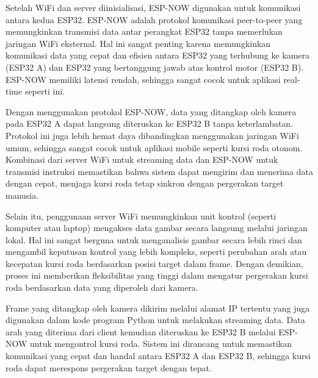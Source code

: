 Setelah WiFi dan server diinisialisasi, ESP-NOW digunakan untuk komunikasi antara kedua ESP32. ESP-NOW adalah protokol komunikasi peer-to-peer yang memungkinkan transmisi data antar perangkat ESP32 tanpa memerlukan jaringan WiFi eksternal. Hal ini sangat penting karena memungkinkan komunikasi data yang cepat dan efisien antara ESP32 yang terhubung ke kamera (ESP32 A) dan ESP32 yang bertanggung jawab atas kontrol motor (ESP32 B). ESP-NOW memiliki latensi rendah, sehingga sangat cocok untuk aplikasi real-time seperti ini.

Dengan menggunakan protokol ESP-NOW, data yang ditangkap oleh kamera pada ESP32 A dapat langsung diteruskan ke ESP32 B tanpa keterlambatan. Protokol ini juga lebih hemat daya dibandingkan menggunakan jaringan WiFi umum, sehingga sangat cocok untuk aplikasi mobile seperti kursi roda otonom. Kombinasi dari server WiFi untuk streaming data dan ESP-NOW untuk transmisi instruksi memastikan bahwa sistem dapat mengirim dan menerima data dengan cepat, menjaga kursi roda tetap sinkron dengan pergerakan target manusia.

Selain itu, penggunaan server WiFi memungkinkan unit kontrol (seperti komputer atau laptop) mengakses data gambar secara langsung melalui jaringan lokal. Hal ini sangat berguna untuk menganalisis gambar secara lebih rinci dan mengambil keputusan kontrol yang lebih kompleks, seperti perubahan arah atau kecepatan kursi roda berdasarkan posisi target dalam frame. Dengan demikian, proses ini memberikan fleksibilitas yang tinggi dalam mengatur pergerakan kursi roda berdasarkan data yang diperoleh dari kamera.

Frame yang ditangkap oleh kamera dikirim melalui alamat IP tertentu yang juga digunakan dalam kode program Python untuk melakukan streaming data. Data arah yang diterima dari client kemudian diteruskan ke ESP32 B melalui ESP-NOW untuk mengontrol kursi roda. Sistem ini dirancang untuk memastikan komunikasi yang cepat dan handal antara ESP32 A dan ESP32 B, sehingga kursi roda dapat merespons pergerakan target dengan tepat.

